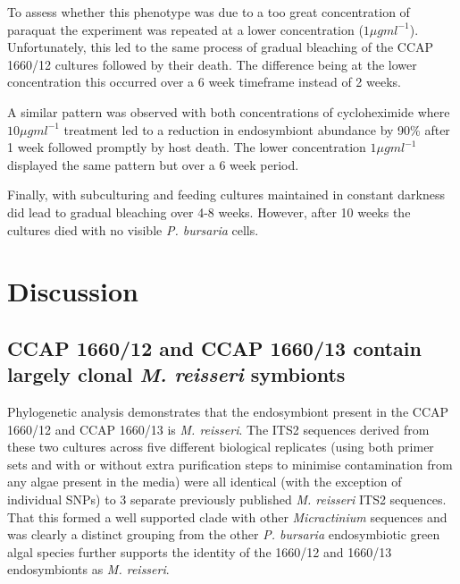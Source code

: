 To assess whether this phenotype was due to a too great concentration of paraquat
the experiment was repeated at a lower concentration  (\(1\mu g ml^{-1}\)).
Unfortunately, this led to the same process of gradual bleaching of the CCAP 
1660/12 cultures followed by their death. The difference being at the lower concentration
this occurred over a 6 week timeframe instead of 2 weeks.


A similar pattern was observed with both concentrations of
cycloheximide where \(10\mu g ml^{-1}\) treatment 
led to a reduction in endosymbiont abundance by 90\%
after 1 week followed promptly by host death. 
The lower concentration \(1\mu g ml^{-1}\) 
displayed the same pattern but over a 6 week period.

Finally, with subculturing and feeding cultures maintained in 
constant darkness did lead to gradual bleaching over 4-8 weeks.
However, after 10 weeks the cultures died with no visible
\textit{P. bursaria} cells.


\section{Discussion}

\subsection{CCAP 1660/12 and CCAP 1660/13 contain largely clonal \textit{M. reisseri} symbionts}

Phylogenetic analysis demonstrates that the endosymbiont present in the CCAP 1660/12
and CCAP 1660/13 is \textit{M. reisseri}.  The ITS2 sequences derived from these
two cultures across five different biological replicates (using both primer sets and with or without 
extra purification steps to minimise contamination from any algae present in the media) 
were all identical (with the exception of individual SNPs) 
to 3 separate previously published \textit{M. reisseri} ITS2 sequences. That this formed
a well supported clade with other \textit{Micractinium} sequences and was clearly a distinct
grouping from the other \textit{P. bursaria} endosymbiotic green algal species 
further supports the identity of the 1660/12 and 1660/13 endosymbionts as \textit{M. reisseri}.

